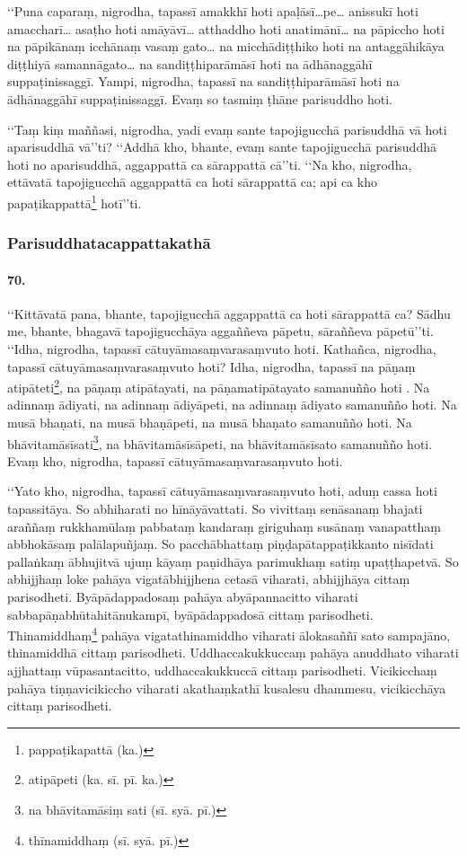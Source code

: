 ‘‘Puna caparaṃ, nigrodha, tapassī amakkhī hoti apaḷāsī…pe… anissukī hoti amaccharī… asaṭho hoti amāyāvī… atthaddho hoti anatimānī… na pāpiccho hoti na pāpikānaṃ icchānaṃ vasaṃ gato… na micchādiṭṭhiko hoti na antaggāhikāya diṭṭhiyā samannāgato… na sandiṭṭhiparāmāsī hoti na ādhānaggāhī suppaṭinissaggī. Yampi, nigrodha, tapassī na sandiṭṭhiparāmāsī hoti na ādhānaggāhī suppaṭinissaggī. Evaṃ so tasmiṃ ṭhāne parisuddho hoti.

‘‘Taṃ kiṃ maññasi, nigrodha, yadi evaṃ sante tapojigucchā parisuddhā vā hoti aparisuddhā vā’’ti? ‘‘Addhā kho, bhante, evaṃ sante tapojigucchā parisuddhā hoti no aparisuddhā, aggappattā ca sārappattā cā’’ti. ‘‘Na kho, nigrodha, ettāvatā tapojigucchā aggappattā ca hoti sārappattā ca; api ca kho papaṭikappattā\footnote{pappaṭikapattā (ka.)} hotī’’ti.

\subsubsection{Parisuddhatacappattakathā}

\paragraph{70.} ‘‘Kittāvatā pana, bhante, tapojigucchā aggappattā ca hoti sārappattā ca? Sādhu me, bhante, bhagavā tapojigucchāya aggaññeva pāpetu, sāraññeva pāpetū’’ti. ‘‘Idha, nigrodha, tapassī cātuyāmasaṃvarasaṃvuto hoti. Kathañca, nigrodha, tapassī cātuyāmasaṃvarasaṃvuto hoti? Idha, nigrodha, tapassī na pāṇaṃ atipāteti\footnote{atipāpeti (ka. sī. pī. ka.)}, na pāṇaṃ atipātayati, na pāṇamatipātayato samanuñño hoti . Na adinnaṃ ādiyati, na adinnaṃ ādiyāpeti, na adinnaṃ ādiyato samanuñño hoti. Na musā bhaṇati, na musā bhaṇāpeti, na musā bhaṇato samanuñño hoti. Na bhāvitamāsīsati\footnote{na bhāvitamāsiṃ sati (sī. syā. pī.)}, na bhāvitamāsīsāpeti, na bhāvitamāsīsato samanuñño hoti. Evaṃ kho, nigrodha, tapassī cātuyāmasaṃvarasaṃvuto hoti.

‘‘Yato kho, nigrodha, tapassī cātuyāmasaṃvarasaṃvuto hoti, aduṃ cassa hoti tapassitāya. So abhiharati no hīnāyāvattati. So vivittaṃ senāsanaṃ bhajati araññaṃ rukkhamūlaṃ pabbataṃ kandaraṃ giriguhaṃ susānaṃ vanapatthaṃ abbhokāsaṃ palālapuñjaṃ. So pacchābhattaṃ piṇḍapātappaṭikkanto nisīdati pallaṅkaṃ ābhujitvā ujuṃ kāyaṃ paṇidhāya parimukhaṃ satiṃ upaṭṭhapetvā. So abhijjhaṃ loke pahāya vigatābhijjhena cetasā viharati, abhijjhāya cittaṃ parisodheti. Byāpādappadosaṃ pahāya abyāpannacitto viharati sabbapāṇabhūtahitānukampī, byāpādappadosā cittaṃ parisodheti. Thinamiddhaṃ\footnote{thīnamiddhaṃ (sī. syā. pī.)} pahāya vigatathinamiddho viharati ālokasaññī sato sampajāno, thinamiddhā cittaṃ parisodheti. Uddhaccakukkuccaṃ pahāya anuddhato viharati ajjhattaṃ vūpasantacitto, uddhaccakukkuccā cittaṃ parisodheti. Vicikicchaṃ pahāya tiṇṇavicikiccho viharati akathaṃkathī kusalesu dhammesu, vicikicchāya cittaṃ parisodheti.

